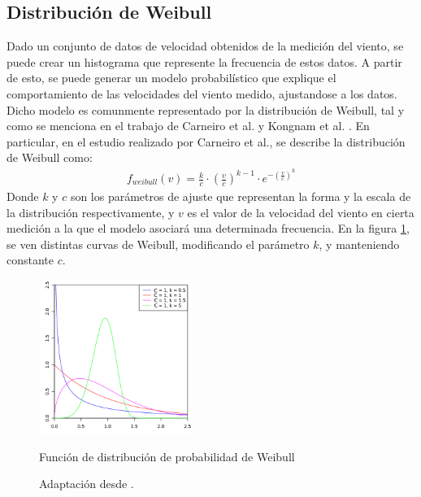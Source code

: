 \subsection{Distribución de Weibull}
Dado un conjunto de datos de velocidad obtenidos de la medición del viento, se puede crear un histograma que represente la frecuencia de estos datos. A partir de esto, se puede generar un modelo probabilístico que explique el comportamiento de las velocidades del viento medido, ajustandose a los datos. Dicho modelo es comunmente representado por la distribución de Weibull, tal y como se menciona en el trabajo de Carneiro et al. \cite{Carneiro15} y Kongnam et al. \cite{Kongnam15}. En particular, en el estudio realizado por Carneiro et al., se describe la distribución de Weibull como: 
 \begin{align}\label{eq:weibull}
     f_{weibull}(v) = \frac{k}{c} \cdot (\frac{v}{c})^{k-1} \cdot e^{-(\frac{v}{c})^ k}
 \end{align}
 Donde $k$ y $c$ son los parámetros de ajuste que representan la forma y la escala de la distribución respectivamente, y $v$ es el valor de la velocidad del viento en cierta medición a la que el modelo asociará una determinada frecuencia. En la figura \ref{fig:weibull_fig}, se ven distintas curvas de Weibull, modificando el parámetro $k$, y manteniendo constante $c$.
\begin{figure}[h!]
    \centering    
    \includegraphics[height=50mm]{figures/weibull_distribution.png} 
    \caption{Función de distribución de probabilidad de Weibull}
    \vspace{-.25cm} 
    \caption*{Adaptación desde \cite{wikiWeibull}.}
    \label{fig:weibull_fig}
\end{figure}
